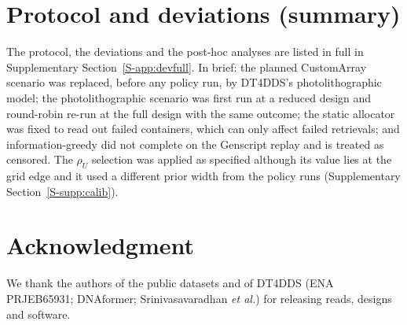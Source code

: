 \documentclass[conference,onecolumn,11pt]{IEEEtran}
\begin{document}
\section{Protocol and deviations (summary)}\label{app:dev}
The protocol, the deviations and the post-hoc analyses are listed in full in Supplementary
Section~\ref{S-app:devfull}.  In brief: the planned CustomArray scenario was replaced, before any policy
run, by DT4DDS's photolithographic model; the photolithographic scenario was first run at a reduced
design and round-robin re-run at the full design with the same outcome; the static allocator was fixed
to read out failed containers, which can only affect failed retrievals; and information-greedy did not
complete on the Genscript replay and is treated as censored.  The $\rho_U$ selection was applied as
specified although its value lies at the grid edge and it used a different prior width from the policy
runs (Supplementary Section~\ref{S-supp:calib}).

\section*{Acknowledgment}
We thank the authors of the public datasets and of DT4DDS (ENA PRJEB65931; DNAformer;
Srinivasavaradhan \emph{et al.}) for releasing reads, designs and software.



\end{document}
